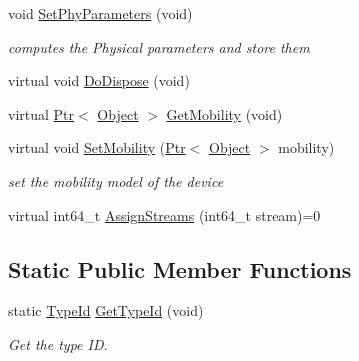 \begin{DoxyCompactItemize}
void \hyperlink{classns3_1_1WimaxPhy_a92a97019dabfe30edfde026f0aaa5725}{Set\+Phy\+Parameters} (void)
\begin{DoxyCompactList}\small\item\em computes the Physical parameters and store them \end{DoxyCompactList}\item 
virtual void \hyperlink{classns3_1_1WimaxPhy_a6a4c4b98b43bd3398ab8caef881b5c5c}{Do\+Dispose} (void)
\item 
virtual \hyperlink{classns3_1_1Ptr}{Ptr}$<$ \hyperlink{classns3_1_1Object}{Object} $>$ \hyperlink{classns3_1_1WimaxPhy_a4dcc7635921e3abf180d7921f6a78e35}{Get\+Mobility} (void)
\item 
virtual void \hyperlink{classns3_1_1WimaxPhy_a101e1cb1cd72b7afa23f3d5e1a6e0c05}{Set\+Mobility} (\hyperlink{classns3_1_1Ptr}{Ptr}$<$ \hyperlink{classns3_1_1Object}{Object} $>$ mobility)
\begin{DoxyCompactList}\small\item\em set the mobility model of the device \end{DoxyCompactList}\item 
virtual int64\+\_\+t \hyperlink{classns3_1_1WimaxPhy_a19ec8497da4a3bea4b9cd4d0827c6763}{Assign\+Streams} (int64\+\_\+t stream)=0
\end{DoxyCompactItemize}
\subsection*{Static Public Member Functions}
\begin{DoxyCompactItemize}
\item 
static \hyperlink{classns3_1_1TypeId}{Type\+Id} \hyperlink{classns3_1_1WimaxPhy_a58a835ff9290a6eca54acba7cf6e8fac}{Get\+Type\+Id} (void)
\begin{DoxyCompactList}\small\item\em Get the type ID. \end{DoxyCompactList}\end{DoxyCompactItemize}

